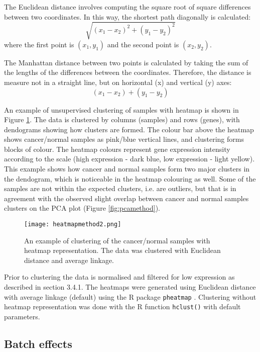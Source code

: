    The Euclidean distance involves computing the square root of square differences between two coordinates. In this way, the shortest path diagonally is calculated: $$ \sqrt{(x_{1}-x_{2})^{2}+(y_{1}-y_{2})^{2}}$$ where the first point is $(x_1, y_1)$ and the second point is $(x_2, y_2).$
    
    The Manhattan distance between two points is calculated by taking the sum of the lengths of the differences between the coordinates. Therefore, the distance is measure not in a straight line, but on horizontal (x) and vertical (y) axes: $$ (x_{1}-x_{2})+(y_{1}-y_{2})$$
    

   An example of unsupervised clustering of samples with heatmap is shown in Figure \ref{fig:heatmapmethod}. The data is clustered by columns (samples) and rows (genes), with dendograms showing how clusters are formed. The colour bar above the heatmap shows cancer/normal samples as pink/blue vertical lines, and clustering forms blocks of colour. The heatmap colours  represent gene expression intensity according to the scale (high expression - dark blue, low expression - light yellow). 
   This example shows how cancer and normal samples form two major clusters in the dendogram, which is noticeable in the heatmap colouring as well. Some of the samples are not within the expected clusters, i.e. are outliers, but that is in agreement with the observed  slight overlap between cancer and normal samples clusters on the PCA plot (Figure \ref{fig:pcamethod}).

        \begin{figure}[h]
        \centering
        \texttt{[image: heatmapmethod2.png]}
        \caption{An example of clustering of the cancer/normal samples with heatmap representation. The data was clustered with Euclidean distance and average linkage. }
        \label{fig:heatmapmethod}
        \end{figure}
    
    Prior to clustering the data is normalised and filtered for low expression as described in section 3.4.1. The heatmaps were generated using Euclidean distance with average linkage (default) using the R package  \texttt{pheatmap} \cite{kolde2012pheatmap}. Clustering without heatmap representation was done with the R function \texttt{hclust()} with default parameters.


   

\newpage


\subsection{Batch effects}

